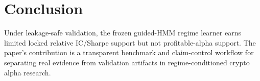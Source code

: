 \documentclass[sigconf,anonymous,review]{acmart}
\begin{document}
\section{Conclusion}
Under leakage-safe validation, the frozen guided-HMM regime learner earns limited locked relative IC/Sharpe support but not profitable-alpha support. The paper's contribution is a transparent benchmark and claim-control workflow for separating real evidence from validation artifacts in regime-conditioned crypto alpha research.



\end{document}
